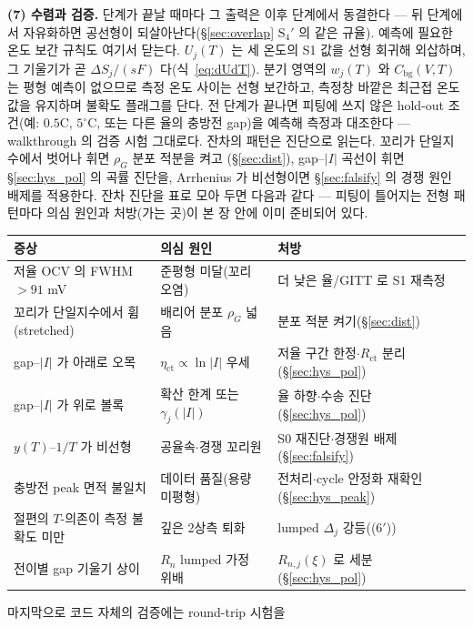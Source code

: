 \documentclass[11pt,a4paper]{article}
\newcommand{\bg}{\mathrm{bg}}
\begin{document}
\textbf{(7) 수렴과 검증.} 단계가 끝날 때마다 그 출력은 이후 단계에서 동결한다 — 뒤 단계에서 자유화하면
공선형이 되살아난다(\S\ref{sec:overlap} S$_4'$ 의 같은 규율). 예측에 필요한 온도 보간 규칙도 여기서 닫는다. $U_j(T)$ 는 세 온도의 S1 값을 선형 회귀해 외삽하며, 그 기울기가
곧 $\Delta S_j/(sF)$ 다(식~\eqref{eq:dUdT}). 분기 영역의 $w_j(T)$ 와 $C_\bg(V,T)$ 는 평형 예측이 없으므로
측정 온도 사이는 선형 보간하고, 측정창 바깥은 최근접 온도 값을 유지하며 불확도 플래그를 단다. 전 단계가 끝나면
피팅에 쓰지 않은 hold-out 조건(예: $0.5$C, $5^\circ$C, 또는 다른 율의 충방전 gap)을 예측해 측정과 대조한다 — walkthrough 의 검증 시험
그대로다. 잔차의 패턴은 진단으로 읽는다. 꼬리가 단일지수에서 벗어나 휘면 $\rho_G$ 분포 적분을 켜고
(\S\ref{sec:dist}), gap--$|I|$ 곡선이 휘면 \S\ref{sec:hys_pol} 의 곡률 진단을, Arrhenius 가 비선형이면
\S\ref{sec:falsify} 의 경쟁 원인 배제를 적용한다. 잔차 진단을 표로 모아 두면 다음과 같다 — 피팅이 틀어지는 전형 패턴마다 의심 원인과 처방(가는 곳)이 본 장
안에 이미 준비되어 있다.
\begin{center}
\renewcommand{\arraystretch}{1.3}
\begin{tabular}{p{} p{} p{}}
\toprule
증상 & 의심 원인 & 처방 \\
\midrule
저율 OCV 의 FWHM $>91$ mV & 준평형 미달(꼬리 오염) & 더 낮은 율/GITT 로 S1 재측정 \\
꼬리가 단일지수에서 휨(stretched) & 배리어 분포 $\rho_G$ 넓음 & 분포 적분 켜기(\S\ref{sec:dist}) \\
gap--$|I|$ 가 아래로 오목 & $\eta_\mathrm{ct}\propto\ln|I|$ 우세 & 저율 구간 한정$\cdot$$R_\mathrm{ct}$ 분리(\S\ref{sec:hys_pol}) \\
gap--$|I|$ 가 위로 볼록 & 확산 한계 또는 $\gamma_j(|I|)$ & 율 하향$\cdot$수송 진단(\S\ref{sec:hys_pol}) \\
$y(T)$--$1/T$ 가 비선형 & 공율속$\cdot$경쟁 꼬리원 & S0 재진단$\cdot$경쟁원 배제(\S\ref{sec:falsify}) \\
충방전 peak 면적 불일치 & 데이터 품질(용량 미평형) & 전처리$\cdot$cycle 안정화 재확인(\S\ref{sec:hys_peak}) \\
절편의 $T$-의존이 측정 불확도 미만 & 깊은 2상측 퇴화 & lumped $\Delta_j$ 강등((6$'$)) \\
전이별 gap 기울기 상이 & $R_n$ lumped 가정 위배 & $R_{n,j}(\xi)$ 로 세분(\S\ref{sec:hys_pol}) \\
\bottomrule
\end{tabular}
\end{center}
마지막으로 코드 자체의 검증에는 round-trip 시험을
\end{document}
